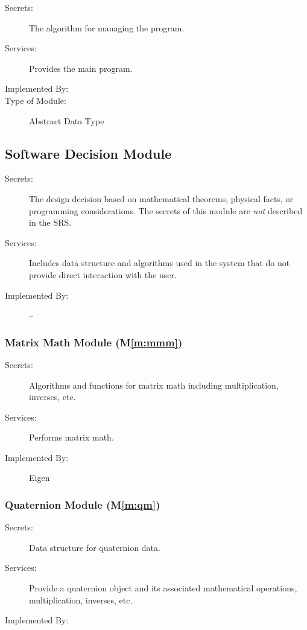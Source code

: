 \documentclass[12pt, titlepage]{article}
\newcommand{\mref}[1]{M\ref{#1}}
\begin{document}
\begin{description}
\item[Secrets:] The algorithm for managing the program.
\item[Services:] Provides the main program.
\item[Implemented By:] \progname
\item[Type of Module:] Abstract Data Type
\end{description}

\subsection{Software Decision Module}

\begin{description}
\item[Secrets:] The design decision based on mathematical theorems, physical facts, or programming
  considerations. The secrets of this module are \emph{not} described in the SRS.
\item[Services:] Includes data structure and algorithms used in the system that do not provide
  direct interaction with the user.
\item[Implemented By:] --
\end{description}

\subsubsection{Matrix Math Module (\mref{m:mmm})}
\begin{description}
  \item[Secrets:] Algorithms and functions for matrix math including multiplication, inverses, etc.
  \item[Services:] Performs matrix math.
  \item[Implemented By:] Eigen \citep{eigenweb}
\end{description}

\subsubsection{Quaternion Module (\mref{m:qm})}
\begin{description}
  \item[Secrets:] Data structure for quaternion data.
  \item[Services:] Provide a quaternion object and its associated mathematical operations, multiplication, inverses, etc.
  \item[Implemented By:] \progname
\end{description}
\end{document}
